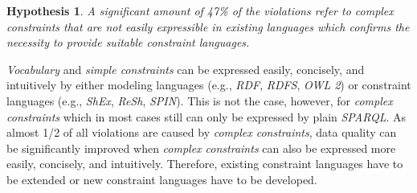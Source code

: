 \documentclass{llncs}
\newtheorem{hyp}{Hypothesis}
\begin{document}
{{\begin{hyp}
A significant amount of 47\% of the violations refer to complex constraints that are not easily expressible in existing languages which confirms the necessity to provide suitable constraint languages.
\end{hyp} 
\emph{Vocabulary} and \emph{simple constraints} can be expressed easily, concisely, and intuitively by either modeling languages (e.g., \emph{RDF}, \emph{RDFS}, \emph{OWL 2}) or constraint languages (e.g., \emph{ShEx}, \emph{ReSh}, \emph{SPIN}). 
This is not the case, however, for \emph{complex constraints} which in most cases still can only be expressed by plain \emph{SPARQL}. 
As almost 1/2 of all violations are caused by \emph{complex constraints}, 
data quality can be significantly improved when \emph{complex constraints} can also be expressed more easily, concisely, and intuitively.
Therefore, existing constraint languages have to be extended or new constraint languages have to be developed.

}}
\end{document}
